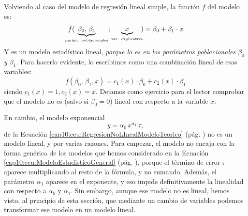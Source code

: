 Volviendo al caso del modelo de regresión lineal simple, la función $f$ del modelo es:
\[f(\hspace{-5mm}\underbrace{\beta_0,\, \beta_1}_{\mbox{\tiny parám. poblacionales}};\underbrace{\phantom{1}x\phantom{1}}_{\mbox{\tiny var. explicativa}}\hspace{-1mm})=
\beta_0+\beta_1\cdot x
\]
Y es %
%
%
un modelo estadístico lineal, {\em porque lo es en los parámetros poblacionales $\beta_0$ y $\beta_1$}. Para hacerlo evidente, lo escribimos como una combinación lineal de esas variables:
\[f(\beta_0,\, \beta_1, x)= c_1(x)\cdot \beta_0+c_2(x)\cdot \beta_1
\]
siendo $c_1(x)=1, c_2(x)=x$. Dejamos como ejercicio para el lector comprobar que el modelo no es (salvo si $\beta_0=0$) lineal con respecto a la variable $x$.

En cambio, el modelo exponencial
\[
y=\alpha_0\, x^{\alpha_1}\,\tau,
\]
de la Ecuación \ref{cap10:ecu:RegresionNoLInealModeloTeorico} (pág. \pageref{cap10:ecu:RegresionNoLInealModeloTeorico}) no es un modelo lineal, y por varias razones. Para empezar, el modelo no encaja con la forma genérica de los modelos que hemos considerado en la Ecuación \ref{cap10:ecu:ModeloEstadisticoGeneral} (pág. \pageref{cap10:ecu:ModeloEstadisticoGeneral}), porque el término de error $\tau$ aparece multiplicando al resto de la fórmula, y no sumando. Además, el parámetro $\alpha_1$ aparece en el exponente, y eso impide definitivamente la linealidad con respecto a $\alpha_0$ y $\alpha_1$. Sin embargo, aunque ese modelo no es lineal, hemos visto, al principio de esta sección, que mediante un cambio de variables podemos transformar ese modelo en un modelo lineal.

